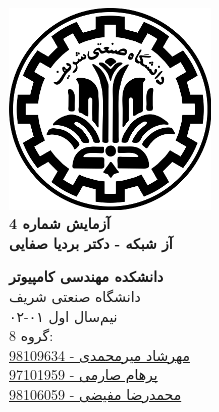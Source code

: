 \documentclass{article}
\begin{document}
\begin{titlepage}
	\begin{center}
		\vspace{0.2cm}
		
		\includegraphics[width=0.4\textwidth]{sharif.png}\\
		\vspace{0.2cm}
		\textbf{ \Huge{آزمایش شماره 4}}\\
		\vspace{0.25cm}
		\textbf{ \Large{آز شبکه - دکتر بردیا صفایی}}
		\vspace{0.2cm}
		
		
		\large \textbf{دانشکده مهندسی کامپیوتر}\\\vspace{0.1cm}
		\large   دانشگاه صنعتی شریف\\\vspace{0.2cm}
		\large   ﻧﯿﻢ‌سال اول ۰۱-۰۲ \\\vspace{0.10cm}
		\large{ گروه 8:}\\
		\large{\href{mailto:mehrshad.mirmohammadi@gmail.com}{مهرشاد میرمحمدی - 98109634}}\\
		\large{\href{mailto:parhaamsaremi@gmail.com}{پرهام صارمی - 97101959}}\\
		\large{\href{mailto:mofayezi.m@gmail.com}{محمدرضا مفیضی - 98106059}}\\
	\end{center}
\end{titlepage}

\newpage

\pagestyle{fancy}
\fancyhf{}
\fancyfoot{}
\setlength{\headheight}{59pt}
\cfoot{\thepage}
\end{document}
